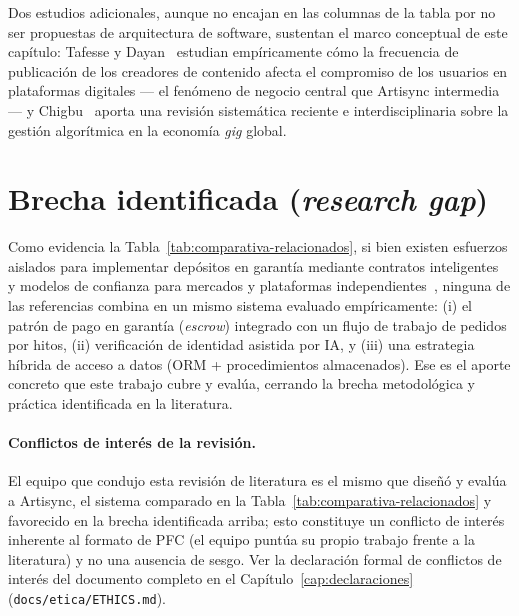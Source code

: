 Dos estudios adicionales, aunque no encajan en las columnas de la tabla por
no ser propuestas de arquitectura de software, sustentan el marco conceptual
de este cap\'itulo: Tafesse y Dayan~\cite{TAFESSE2023} estudian emp\'iricamente
c\'omo la frecuencia de publicaci\'on de los creadores de contenido afecta el
compromiso de los usuarios en plataformas digitales --- el fen\'omeno de
negocio central que Artisync intermedia --- y Chigbu~\cite{CHIGBU2026} aporta
una revisi\'on sistem\'atica reciente e interdisciplinaria sobre la gesti\'on
algor\'itmica en la econom\'ia \emph{gig} global.

\section{Brecha identificada (\emph{research gap})}

Como evidencia la Tabla~\ref{tab:comparativa-relacionados}, si bien
existen esfuerzos aislados para implementar dep\'ositos en garant\'ia
mediante contratos inteligentes~\cite{ASGAONKAR2019} y modelos de confianza
para mercados y plataformas independientes~\cite{TSMART2021,GU2021,LAKSONO2024,BANDARI2026},
ninguna de las referencias combina en un mismo sistema evaluado emp\'iricamente:
(i) el patr\'on de pago en garant\'ia (\emph{escrow}) integrado con un flujo de
trabajo de pedidos por hitos, (ii) verificaci\'on de identidad asistida por IA,
y (iii) una estrategia h\'ibrida de acceso a datos (ORM + procedimientos
almacenados). Ese es el aporte concreto que este trabajo cubre y eval\'ua,
cerrando la brecha metodol\'ogica y pr\'actica identificada en la literatura.

\paragraph{Conflictos de inter\'es de la revisi\'on.} El equipo que
condujo esta revisi\'on de literatura es el mismo que dise\~n\'o y
eval\'ua a Artisync, el sistema comparado en la Tabla~\ref{tab:comparativa-relacionados}
y favorecido en la brecha identificada arriba; esto constituye un
conflicto de inter\'es inherente al formato de PFC (el equipo punt\'ua
su propio trabajo frente a la literatura) y no una ausencia de sesgo.
Ver la declaraci\'on formal de conflictos de inter\'es del documento
completo en el Cap\'itulo~\ref{cap:declaraciones}
(\texttt{docs/etica/ETHICS.md}).
